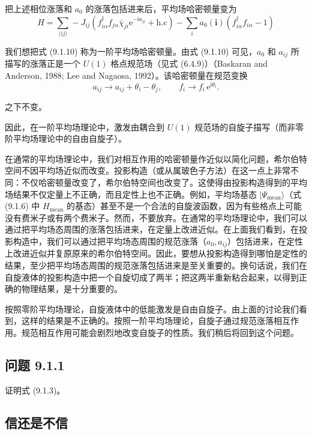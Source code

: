 把上述相位涨落和 $a_0$ 的涨落包括进来后，平均场哈密顿量变为
\begin{equation*}
H=\sum_{\langle ij\rangle}-J_{ij}\left(f^{\dagger}_{i\alpha}f_{j\alpha}\bar{\chi}_{ji}\mathrm{e}^{-\mathrm{i}a_{ji}}+\text{h.c}\right)-\sum_{i}a_0(\pmb{i})\left(f^{\dagger}_{i\alpha}f_{i\alpha}-1\right)
\tag{9.1.10}
\end{equation*}

我们想把式 (9.1.10) 称为一阶平均场哈密顿量。由式 (9.1.10) 可见，$a_0$ 和 $a_{ij}$ 所描写的涨落正是一个 $U(1)$ 格点规范场（见式 (6.4.9)）（Baskaran and Anderson, 1988; Lee and Nagaosa, 1992）。该哈密顿量在规范变换
\begin{equation*}
a_{ij}\rightarrow a_{ij}+\theta_i-\theta_j,\qquad f_i\rightarrow f_i\,\mathrm{e}^{\mathrm{i}\theta_i}.
\tag{9.1.11}
\end{equation*}

之下不变。

因此，在一阶平均场理论中，激发由耦合到 $U(1)$ 规范场的自旋子描写（而非零阶平均场理论中的自由自旋子）。

在通常的平均场理论中，我们对相互作用的哈密顿量作近似以简化问题，希尔伯特空间不因平均场近似而改变。投影构造（或从属玻色子方法）在这一点上非常不同：不仅哈密顿量改变了，希尔伯特空间也改变了。这使得由投影构造得到的平均场结果不仅定量上不正确，而且定性上也不正确。例如，平均场基态 $|\Psi_{\text{mean}}\rangle$（式 (9.1.6) 中 $H_{\text{mean}}$ 的基态）甚至不是一个合法的自旋波函数，因为有些格点上可能没有费米子或有两个费米子。然而，不要放弃。在通常的平均场理论中，我们可以通过把平均场态周围的涨落包括进来，在定量上改进近似。在上面我们看到，在投影构造中，我们可以通过把平均场态周围的规范涨落（$a_0,a_{ij}$）包括进来，在定性上改进近似并复原原来的希尔伯特空间。因此，要想从投影构造得到哪怕是定性的结果，至少把平均场态周围的规范涨落包括进来是至关重要的。换句话说，我们在自旋液体的投影构造中把一个自旋切成了两半；把这两半重新粘合起来，以得到正确的物理结果，是十分重要的。

按照零阶平均场理论，自旋液体中的低能激发是自由自旋子。由上面的讨论我们看到，这样的结果是不正确的。按照一阶平均场理论，自旋子通过规范涨落相互作用。规范相互作用可能会剧烈地改变自旋子的性质。我们稍后将回到这个问题。

\subsection*{问题 9.1.1}

证明式 (9.1.3)。

\subsection{信还是不信}

